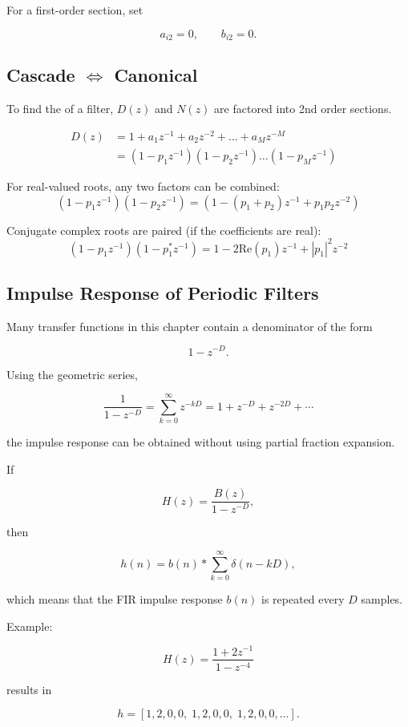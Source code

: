 For a first-order section, set

\[
a_{i2}=0,
\qquad
b_{i2}=0.
\]

\subsection{Cascade $\Leftrightarrow$ Canonical}
To find the  of a filter, $D(z)$ and $N(z)$ are
factored into 2nd order sections.

\begin{align*}
D(z) &= 1 + a_1 z^{-1} + a_2 z^{-2} + \dots + a_M z^{-M} &\\
&=(1-p_1z^{-1})(1-p_2z^{-1}) \dots (1-p_Mz^{-1})&
\end{align*}

For real-valued roots, any two factors can be combined:
\begin{equation*}
	(1 - p_1 z^{-1}) (1 - p_2 z^{-1}) = (1 - (p_1 + p_2) z^{-1} + p_1 p_2 z^{-2})
\end{equation*}

Conjugate complex roots are paired (if the coefficients are real):
\begin{equation*}
	(1 - p_1 z^{-1}) (1 - p_1^* z^{-1}) = 1 - 2 \text{Re}(p_1) z^{-1} + |p_1|^2 z^{-2}
\end{equation*}

\subsection{Impulse Response of Periodic Filters}

Many transfer functions in this chapter contain a denominator of the form

\[
1-z^{-D}.
\]

Using the geometric series,

\[
\boxed{
\frac{1}{1-z^{-D}}
=
\sum_{k=0}^{\infty}z^{-kD}
=
1+z^{-D}+z^{-2D}+\cdots
}
\]

the impulse response can be obtained without using partial fraction
expansion.

If

\[
H(z)=
\frac{B(z)}
{1-z^{-D}},
\]

then

\[
h(n)
=
b(n)
*
\sum_{k=0}^{\infty}\delta(n-kD),
\]

which means that the FIR impulse response $b(n)$ is repeated every $D$
samples.

Example:

\[
H(z)=
\frac{1+2z^{-1}}
{1-z^{-4}}
\]

results in

\[
h=
[1,2,0,0,\;
1,2,0,0,\;
1,2,0,0,\ldots].
\]
